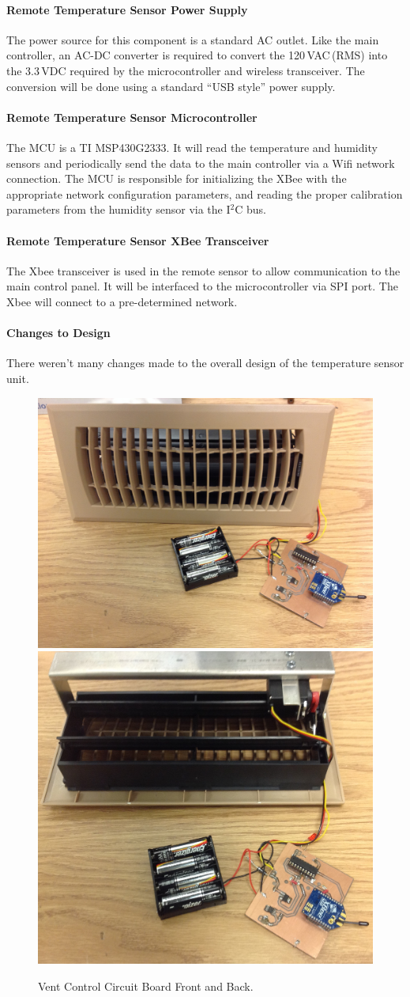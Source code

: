 \paragraph{Remote Temperature Sensor Power Supply}
The power source for this component is a standard AC outlet.  Like the main controller, an AC-DC converter is required to convert the 120\,VAC\,(RMS) into the 3.3\,VDC required by the microcontroller and wireless transceiver.  The conversion will be done using a standard ``USB style'' power supply.
\paragraph{Remote Temperature Sensor Microcontroller}
The MCU is a TI MSP430G2333.  It will read the temperature and humidity sensors and periodically send the data to the main controller via a Wifi network connection.  The MCU is responsible for initializing the XBee with the appropriate network configuration parameters, and reading the proper calibration parameters from the humidity sensor via the I$^2$C bus.
\paragraph{Remote Temperature Sensor XBee Transceiver}
The Xbee transceiver is used in the remote sensor to allow communication to the main control panel. It will be interfaced to the microcontroller via SPI port.  The Xbee will connect to a pre-determined network.
\paragraph{Changes to Design}
There weren't many changes made to the overall design of the temperature sensor unit. 

\begin{figure} [htb]
\centering
\includegraphics[width=.45\textwidth]{Vent_Control_Unit.JPG}
\includegraphics[width=.44\textwidth]{Vent_Control_Unit2.JPG}
\caption{Vent Control Circuit Board Front and Back.}
\label{fig:Vent_Board}
\end{figure}


